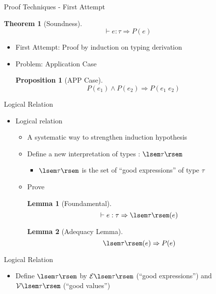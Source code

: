 \documentclass{beamer}
\newtheorem{thm}{Theorem}
\newtheorem{lem}{Lemma}
\newtheorem{prop}{Proposition}
\begin{document}
\begin{frame}{Proof Techniques - First Attempt}

  \begin{thm}[Soundness]
    $$
    \vdash e:\tau \Rightarrow P(e)
    $$
  \end{thm}

  \begin{itemize}
  \item First Attempt: Proof by induction on typing derivation
  \item Problem: Application Case
  \begin{prop}[APP Case]
    $$
    P(e_1) \wedge P(e_2) \Rightarrow P(e_1\;e_2)
    $$
  \end{prop}
  \end{itemize}

\end{frame}


\begin{frame}{Logical Relation}

\begin{itemize}
\item Logical relation
  \begin{itemize}
  \item A systematic way to strengthen induction hypothesis
  \item Define a new interpretation of types : $\lsem\tau\rsem$
    \begin{itemize}
    \item $\lsem\tau\rsem$ is the set of ``good expressions'' of type $\tau$
    \end{itemize}
    
  \item Prove 
    \begin{lem}[Foundamental]
      $$
      \vdash e:\tau \Rightarrow \lsem\tau\rsem(e)
      $$
    \end{lem}

    \begin{lem}[Adequacy Lemma]
      $$
      \lsem\tau\rsem(e) \Rightarrow P(e)
      $$
    \end{lem}
  \end{itemize}
\end{itemize}

\end{frame}

\begin{frame}{Logical Relation}

\begin{itemize}
\item Define $\lsem\tau\rsem$ by $\mathcal{E}\lsem\tau\rsem$ (``good expressions'') and $\mathcal{V}\lsem\tau\rsem$ (``good values'')
$$
$$
\end{itemize}

\end{frame}
\end{document}
